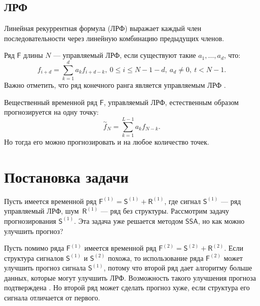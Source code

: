 \documentclass[specialist, substylefile = spbureport.rtx,
    subf,href,colorlinks=true, 12pt]{disser}
\newcommand{\F}{\mathsf{F}}
\newcommand{\sfS}{\mathsf{S}}
\newcommand{\sfR}{\mathsf{R}}
\newcommand{\SSA}{\mathsf{SSA}}
\begin{document}
    \section{ЛРФ}
        Линейная рекуррентная формула (ЛРФ) выражает каждый член последовательности через линейную комбинацию предыдущих членов.

        Ряд $\F$ длины $N$ --- управляемый ЛРФ, если существуют такие $a_1, \dotso, a_d$, что:
        $$f_{i+d} = \sum_{k=1}^d a_k f_{i+d-k},\ 0 \leq i \leq N - 1 - d,\ a_d \neq 0,\ t < N - 1.$$
        Важно отметить, что ряд конечного ранга является управляемым ЛРФ \cite[2.1.2.2, стр. 35]{SSA_with_R}.
        
        

        Вещественный временной ряд $\F$, управляемый ЛРФ, естественным образом прогнозируется на одну точку:
        $$\overset{\sim}{f}_{N} = \sum_{k=1}^{L-1} a_k f_{N-k}.$$
        Но тогда его можно прогнозировать и на любое количество точек.




    \chapter{Постановка задачи}

        Пусть имеется временной ряд $\F^{(1)} = \sfS^{(1)} + \sfR^{(1)}$, где сигнал $\sfS^{(1)}$ --- ряд управляемый ЛРФ, шум~$\sfR^{(1)}$ --- ряд без структуры. Рассмотрим задачу прогнозирования $\sfS^{(1)}$. Эта задача уже решается методом $\SSA$, но как можно улучшить прогноз?

        Пусть помимо ряда $\F^{(1)}$ имеется временной ряд $\F^{(2)} = \sfS^{(2)} + \sfR^{(2)}$.
        Если структура сигналов $\sfS^{(1)}$ и $\sfS^{(2)}$ похожа, то использование ряда $\F^{(2)}$ может улучшить прогноз сигнала $\sfS^{(1)}$, потому что второй ряд дает алгоритму больше данных, которые могут улучшить ЛРФ.
        Возможность такого улучшения прогноза подтверждена \cite[4.3.3.3, стр. 216]{SSA_with_R}.
        Но второй ряд может сделать прогноз хуже, если структура его сигнала отличается от первого.
\end{document}
